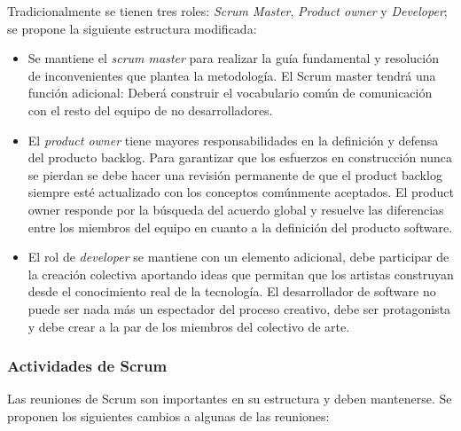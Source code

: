 Tradicionalmente se tienen tres roles: \textit{Scrum Master}, \textit{Product owner} y \textit{Developer}; se propone la siguiente estructura modificada:

\begin{itemize}

  \item Se mantiene el \textit{scrum master} para realizar la guía fundamental y resolución de inconvenientes que plantea la metodología. El Scrum master tendrá una función adicional: Deberá construir el vocabulario común de comunicación con el resto del equipo de no desarrolladores.

  \item El \textit{product owner} tiene mayores responsabilidades en la definición y defensa del producto backlog. Para garantizar que los esfuerzos en construcción nunca se pierdan se debe  hacer una revisión permanente de que el product backlog siempre esté actualizado con los conceptos comúnmente aceptados. El product owner responde por la búsqueda del acuerdo global y resuelve las diferencias entre los miembros del equipo en cuanto a la definición del producto software.

  \item El rol de \textit{developer} se mantiene con un elemento adicional, debe participar de la creación colectiva aportando ideas que permitan que los artistas construyan desde el conocimiento real de la tecnología. El desarrollador de software no puede ser nada más un espectador del proceso creativo, debe ser protagonista y debe crear a la par de los miembros del colectivo de arte.

\end{itemize}

\subsubsection{Actividades de Scrum}

Las reuniones de Scrum son importantes en su estructura y deben mantenerse. Se proponen los siguientes cambios a algunas de las reuniones:


